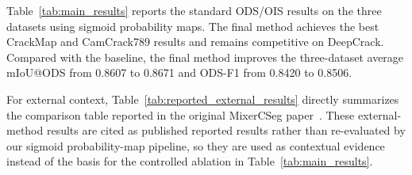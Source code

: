 \documentclass[preprint,12pt]{elsarticle}
\begin{document}
Table~\ref{tab:main_results} reports the standard ODS/OIS results on the three datasets using sigmoid probability maps. The final method achieves the best CrackMap and CamCrack789 results and remains competitive on DeepCrack. Compared with the baseline, the final method improves the three-dataset average mIoU@ODS from 0.8607 to 0.8671 and ODS-F1 from 0.8420 to 0.8506.

\begin{table}[H]
\centering
\caption{Standard evaluation results using ODS/OIS threshold sweeping.}
\label{tab:main_results}
\end{table}

For external context, Table~\ref{tab:reported_external_results} directly summarizes the comparison table reported in the original MixerCSeg paper~\cite{mixercseg}. These external-method results are cited as published reported results rather than re-evaluated by our sigmoid probability-map pipeline, so they are used as contextual evidence instead of the basis for the controlled ablation in Table~\ref{tab:main_results}.
\end{document}
